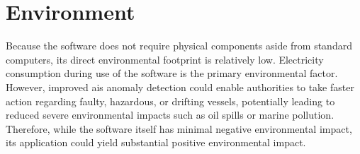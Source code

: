 \section{Environment}

Because the software does not require physical components aside from standard computers, its direct environmental footprint is relatively low. Electricity consumption during use of the software is the primary environmental factor. However, improved \acrshort{ais} anomaly detection could enable authorities to take faster action regarding faulty, hazardous, or drifting vessels, potentially leading to reduced severe environmental impacts such as oil spills or marine pollution. Therefore, while the software itself has minimal negative environmental impact, its application could yield substantial positive environmental impact.
